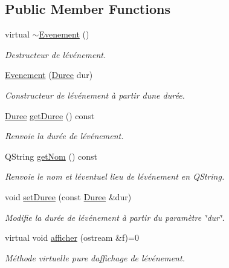 \subsection*{Public Member Functions}
\begin{DoxyCompactItemize}
\item 
virtual \hyperlink{class_evenement_a55edc55f582f7992296b10e8a60476c8}{$\sim$\+Evenement} ()
\begin{DoxyCompactList}\small\item\em Destructeur de l\textquotesingle{}événement. \end{DoxyCompactList}\item 
\hyperlink{class_evenement_ab538f1a96d3b5b63f8ce0e89f16bcafd}{Evenement} (\hyperlink{class_t_i_m_e_1_1_duree}{Duree} dur)
\begin{DoxyCompactList}\small\item\em Constructeur de l\textquotesingle{}événement à partir d\textquotesingle{}une durée. \end{DoxyCompactList}\item 
\hyperlink{class_t_i_m_e_1_1_duree}{Duree} \hyperlink{class_evenement_a43c92d1917720282ac6ba3a598fac708}{get\+Duree} () const 
\begin{DoxyCompactList}\small\item\em Renvoie la durée de l\textquotesingle{}événement. \end{DoxyCompactList}\item 
Q\+String \hyperlink{class_evenement_aa5f395f7681426893894fb73eb851459}{get\+Nom} () const 
\begin{DoxyCompactList}\small\item\em Renvoie le nom et l\textquotesingle{}éventuel lieu de l\textquotesingle{}événement en Q\+String. \end{DoxyCompactList}\item 
void \hyperlink{class_evenement_a42e914b00d21eb4377d7c0a242a88e9a}{set\+Duree} (const \hyperlink{class_t_i_m_e_1_1_duree}{Duree} \&dur)
\begin{DoxyCompactList}\small\item\em Modifie la durée de l\textquotesingle{}événement à partir du paramètre \char`\"{}dur\char`\"{}. \end{DoxyCompactList}\item 
virtual void \hyperlink{class_evenement_af217f0cd3d421e3f113a13536ee63593}{afficher} (ostream \&f)=0
\begin{DoxyCompactList}\small\item\em Méthode virtuelle pure d\textquotesingle{}affichage de l\textquotesingle{}événement. \end{DoxyCompactList}\end{DoxyCompactItemize}


